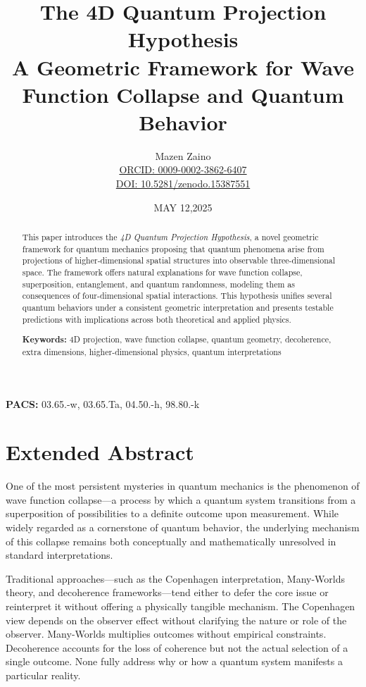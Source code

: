 \documentclass[12pt]{article}
\title{\textbf{\Huge The 4D Quantum Projection Hypothesis}\\[1ex]
\Large A Geometric Framework for Wave Function Collapse and Quantum Behavior}
\author{
\Large Mazen Zaino\\
\normalsize\href{https://orcid.org/0009-0002-3862-6407}{ORCID: 0009-0002-3862-6407}\\
\normalsize\href{https://doi.org/10.5281/zenodo.15387551}{DOI: 10.5281/zenodo.15387551}
}
\date{MAY 12,2025}
\begin{document}
\maketitle
\vspace{1.5em} %

\begin{abstract}
\noindent
This paper introduces the \textit{4D Quantum Projection Hypothesis}, a novel geometric framework for quantum mechanics proposing that quantum phenomena arise from projections of higher-dimensional spatial structures into observable three-dimensional space. The framework offers natural explanations for wave function collapse, superposition, entanglement, and quantum randomness, modeling them as consequences of four-dimensional spatial interactions. This hypothesis unifies several quantum behaviors under a consistent geometric interpretation and presents testable predictions with implications across both theoretical and applied physics.

\vspace{1em}
\noindent\textbf{Keywords:} 4D projection, wave function collapse, quantum geometry, decoherence, extra dimensions, higher-dimensional physics, quantum interpretations
\end{abstract}
\noindent\textbf{PACS:} 03.65.-w, 03.65.Ta, 04.50.-h, 98.80.-k
\thispagestyle{plain}
\newpage

\tableofcontents
\newpage
\section{Extended Abstract}
\noindent
One of the most persistent mysteries in quantum mechanics is the phenomenon of wave function collapse—a process by which a quantum system transitions from a superposition of possibilities to a definite outcome upon measurement. While widely regarded as a cornerstone of quantum behavior, the underlying mechanism of this collapse remains both conceptually and mathematically unresolved in standard interpretations.

\par
Traditional approaches—such as the Copenhagen interpretation, Many-Worlds theory, and decoherence frameworks—tend either to defer the core issue or reinterpret it without offering a physically tangible mechanism. The Copenhagen view depends on the observer effect without clarifying the nature or role of the observer. Many-Worlds multiplies outcomes without empirical constraints. Decoherence accounts for the loss of coherence but not the actual selection of a single outcome. None fully address why or how a quantum system manifests a particular reality.
\end{document}
